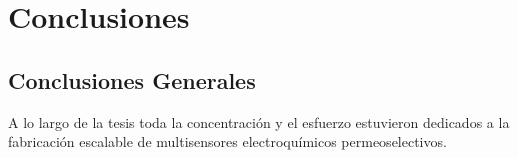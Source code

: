  \newcommand{\NoBiblioConc}[1]{
 \ifthenelse{\equal{#1}{verdadero}}{}{}
 \NoBiblioConc{verdadero}}

 	
 \FormatoCapituloUnaLinea
 
 \chapter{Conclusiones}
 \label{chap:Conclusiones}

 \thispagestyle{empty}
	


 \vfill
 \minitoc
 \newpage

\section{Conclusiones Generales}

A lo largo de la tesis toda la concentración y el esfuerzo estuvieron dedicados a la fabricación escalable de multisensores electroquímicos permeoselectivos. 

